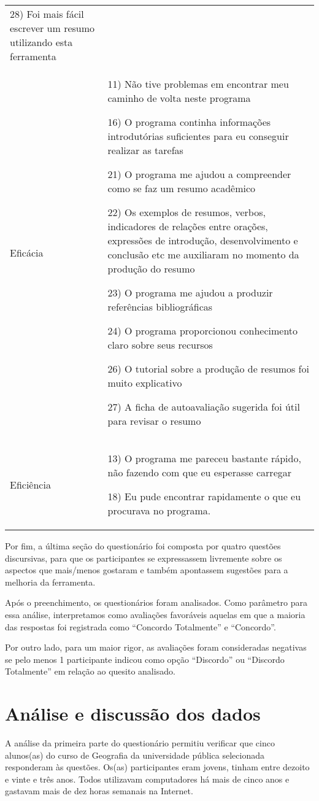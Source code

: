 \documentclass[portuguese]{textolivre}
\begin{document}
\begin{table}[htbp]
\begin{threeparttable}
\begin{small}
\begin{tabular}{p{2cm} p{8cm}}
28) Foi mais fácil escrever um resumo utilizando esta ferramenta \\ 
Eficácia & 
11) Não tive problemas em encontrar meu caminho de volta neste programa

16) O programa continha informações introdutórias suficientes para eu conseguir realizar as tarefas

21) O programa me ajudou a compreender como se faz um resumo acadêmico

22) Os exemplos de resumos, verbos, indicadores de relações entre orações, expressões de introdução, desenvolvimento e conclusão etc me auxiliaram no momento da produção do resumo

23) O programa me ajudou a produzir referências bibliográficas

24) O programa proporcionou conhecimento claro sobre seus recursos

26) O tutorial sobre a produção de resumos foi muito explicativo

27) A ficha de autoavaliação sugerida foi útil para revisar o resumo \\
Eficiência &
13) O programa me pareceu bastante rápido, não fazendo com que eu esperasse carregar

18) Eu pude encontrar rapidamente o que eu procurava no programa. \\
\bottomrule
\end{tabular}
\end{small}
\end{threeparttable}
\end{table}

Por fim, a última seção do questionário foi composta por quatro questões discursivas, para que os participantes se expressassem livremente sobre os aspectos que mais/menos gostaram e também apontassem sugestões para a melhoria da ferramenta.

Após o preenchimento, os questionários foram analisados. Como parâmetro para essa análise, interpretamos como avaliações favoráveis aquelas em que a maioria das respostas foi registrada como “Concordo Totalmente” e “Concordo”.

Por outro lado, para um maior rigor, as avaliações foram consideradas negativas se pelo menos 1 participante indicou como opção “Discordo” ou “Discordo Totalmente” em relação ao quesito analisado.

\section{Análise e discussão dos dados}\label{sec-organizacao}
A análise da primeira parte do questionário permitiu verificar que cinco alunos(as) do curso de Geografia da universidade pública selecionada responderam às questões. Os(as) participantes eram jovens, tinham entre dezoito e vinte e três anos. Todos utilizavam computadores há mais de cinco anos e gastavam mais de dez horas semanais na Internet.
\end{document}
